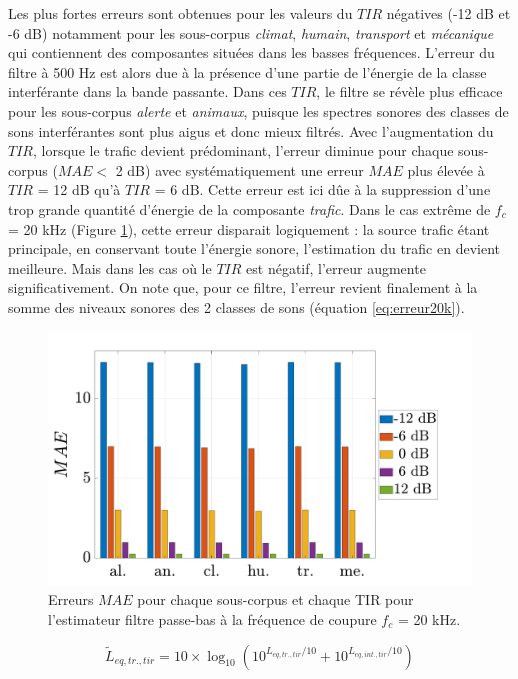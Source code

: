 Les plus fortes erreurs sont obtenues pour les valeurs du $TIR$ négatives (-12 dB et -6 dB) notamment pour les sous-corpus \textit{climat}, \textit{humain}, \textit{transport} et \textit{mécanique} qui contiennent des composantes situées dans les basses fréquences. L'erreur du filtre à 500 Hz est alors due à la présence d'une partie de l'énergie de la classe interférante dans la bande passante. Dans ces $TIR$, le filtre se révèle plus efficace pour les sous-corpus \textit{alerte} et \textit{animaux}, puisque les spectres sonores des classes de sons interférantes sont plus aigus et donc mieux filtrés.
Avec l'augmentation du $TIR$, lorsque le trafic devient prédominant, l'erreur diminue pour chaque sous-corpus ($MAE <$ 2 dB) avec systématiquement une erreur $MAE$ plus élevée à $TIR$ = 12 dB qu'à $TIR$ = 6 dB. Cette erreur est ici dûe à la suppression d'une trop grande quantité d'énergie de la composante \textit{trafic}. Dans le cas extrême de $f_c$ = 20 kHz (Figure \ref{fig:filtre_amb_tir_20k}), cette erreur disparait logiquement : la source trafic étant principale, en conservant toute l'énergie sonore, l'estimation du trafic en devient meilleure. Mais dans les cas où le $TIR$ est négatif, l'erreur augmente significativement. On note que, pour ce filtre, l'erreur revient finalement à la somme des niveaux sonores des 2 classes de sons (équation \ref{eq:erreur20k}).

\begin{figure}[h!]
\centering
\includegraphics[width=0.7\linewidth]{./figures/resultats/amb_filtre_20k_bar.pdf}
\caption{Erreurs $MAE$ pour chaque sous-corpus et chaque TIR pour l'estimateur filtre passe-bas à la fréquence de coupure $f_c$ = 20 kHz.}
\label{fig:filtre_amb_tir_20k}
\end{figure}

\begin{equation}\label{eq:erreur20k}
\tilde{L}_{eq,tr.,tir} = 10\times \log_{10}\left(10^{L_{eq,tr.,tir}/10}+10^{L_{eq,int.,tir}/10}\right)
\end{equation}


